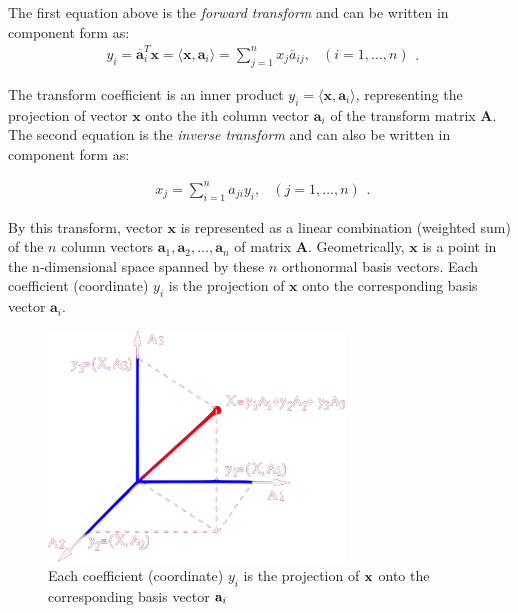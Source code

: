 \documentclass[10pt,b5paper,titlepage]{book}
\begin{document}
The first equation above is the \textit{forward transform} and can be written in component form as:
\begin{equation}
    \begin{array}{lr}
        y_{i} = \overline{\mathbf{a}}_{i}^{T} \mathbf{x}
        = \langle \mathbf{x}, \mathbf{a}_{i} \rangle
        = \sum_{j=1}^{n} x_{j} \overline{a}_{ij}, & (i = 1, \dots, n)
    \end{array}
.\end{equation}

The transform coefficient is an inner product $y_i = \langle \mathbf{x}, \mathbf{a}_i \rangle$, representing the projection of vector $\mathbf{x}$ onto the ith column vector  $\mathbf{a}_i$ of the transform matrix $\mathbf{A}$. The second equation is the \textit{inverse transform} and can also be written in component form as:

\begin{equation}
    \begin{array}{lr}
        x_j = \sum_{i=1}^{n} a_{ji} y_{i}, & (j = 1, \dots, n)
    \end{array}
.\end{equation}

By this transform, vector $\mathbf{x}$ is represented as a linear combination (weighted sum) of the $n$ column vectors  $\mathbf{a}_1, \mathbf{a}_2, \dots, \mathbf{a}_n$ of matrix $\mathbf{A}$. Geometrically,  $\mathbf{x}$ is a point in the n-dimensional space spanned by these $n$ orthonormal basis vectors. Each coefficient (coordinate)  $y_i$ is the projection of  $\mathbf{x}$ onto the corresponding basis vector $\mathbf{a}_i$.

\begin{figure}[htpb]
    \centering
    \includegraphics[width=0.7\textwidth]{./img/unitary_transform_1_inv}
    \caption[Unitary transform]{Each coefficient (coordinate) $y_i$ is the projection of ${\bf x}$ onto the corresponding basis vector ${\bf a}_i$}
    \label{fig:unitary_transform_1}
\end{figure}
\end{document}
